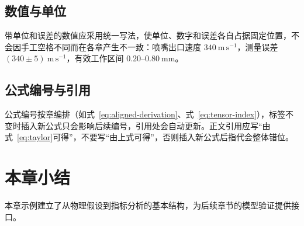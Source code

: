 \subsection{数值与单位}

带单位和误差的数值应采用统一写法，使单位、数字和误差各自占据固定位置，不会因手工空格不同而在各章产生不一致：喷嘴出口速度 $340~\mathrm{m\,s^{-1}}$，测量误差 $(340\pm5)~\mathrm{m\,s^{-1}}$，有效工作区间 $0.20$--$0.80~\mathrm{mm}$。

\subsection{公式编号与引用}

公式编号按章编排（如式~\eqref{eq:aligned-derivation}、式~\eqref{eq:tensor-index}），标签不变时插入新公式只会影响后续编号，引用处会自动更新。正文引用应写“由式~\eqref{eq:taylor}可得”，不要写“由上式可得”，否则插入新公式后指代会整体错位。

\section{本章小结}

本章示例建立了从物理假设到指标分析的基本结构，为后续章节的模型验证提供接口。
